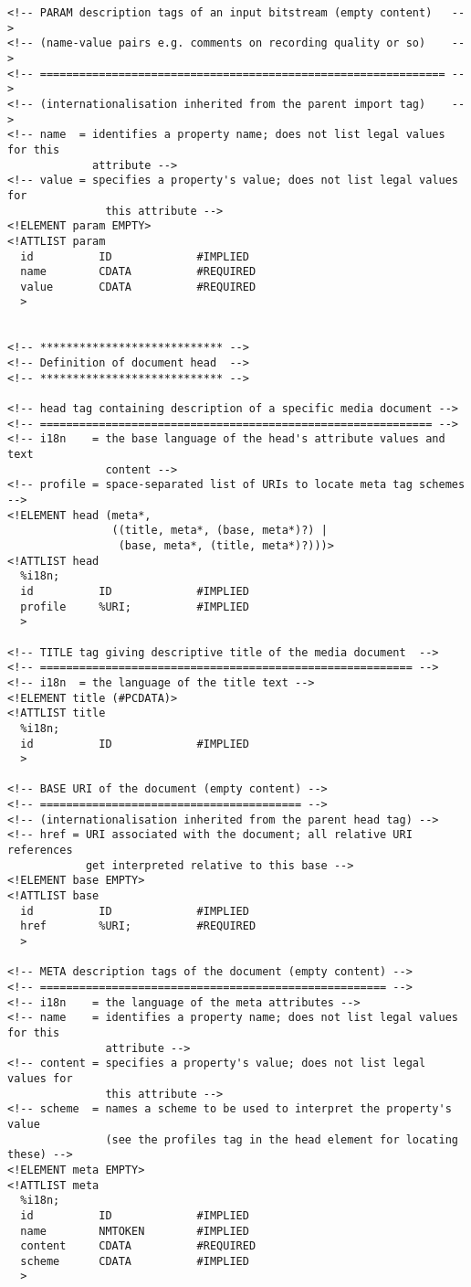 \begin{verbatim}
<!-- PARAM description tags of an input bitstream (empty content)   -->
<!-- (name-value pairs e.g. comments on recording quality or so)    -->
<!-- ============================================================== -->
<!-- (internationalisation inherited from the parent import tag)    -->
<!-- name  = identifies a property name; does not list legal values for this 
             attribute --> 
<!-- value = specifies a property's value; does not list legal values for 
               this attribute -->
<!ELEMENT param EMPTY>
<!ATTLIST param
  id          ID             #IMPLIED
  name        CDATA          #REQUIRED
  value       CDATA          #REQUIRED
  >


<!-- **************************** -->
<!-- Definition of document head  -->
<!-- **************************** -->

<!-- head tag containing description of a specific media document -->
<!-- ============================================================ -->
<!-- i18n    = the base language of the head's attribute values and text 
               content -->
<!-- profile = space-separated list of URIs to locate meta tag schemes -->
<!ELEMENT head (meta*,
                ((title, meta*, (base, meta*)?) |
                 (base, meta*, (title, meta*)?)))>
<!ATTLIST head
  %i18n;
  id          ID             #IMPLIED
  profile     %URI;          #IMPLIED
  >

<!-- TITLE tag giving descriptive title of the media document  -->
<!-- ========================================================= -->
<!-- i18n  = the language of the title text -->
<!ELEMENT title (#PCDATA)>
<!ATTLIST title 
  %i18n;
  id          ID             #IMPLIED
  >

<!-- BASE URI of the document (empty content) --> 
<!-- ======================================== -->
<!-- (internationalisation inherited from the parent head tag) -->
<!-- href = URI associated with the document; all relative URI references
            get interpreted relative to this base -->
<!ELEMENT base EMPTY>
<!ATTLIST base
  id          ID             #IMPLIED
  href        %URI;          #REQUIRED
  >

<!-- META description tags of the document (empty content) -->
<!-- ===================================================== -->
<!-- i18n    = the language of the meta attributes -->
<!-- name    = identifies a property name; does not list legal values for this 
               attribute --> 
<!-- content = specifies a property's value; does not list legal values for 
               this attribute -->
<!-- scheme  = names a scheme to be used to interpret the property's value 
               (see the profiles tag in the head element for locating these) -->
<!ELEMENT meta EMPTY>
<!ATTLIST meta
  %i18n;
  id          ID             #IMPLIED
  name        NMTOKEN        #IMPLIED
  content     CDATA          #REQUIRED
  scheme      CDATA          #IMPLIED
  >


\end{verbatim}
